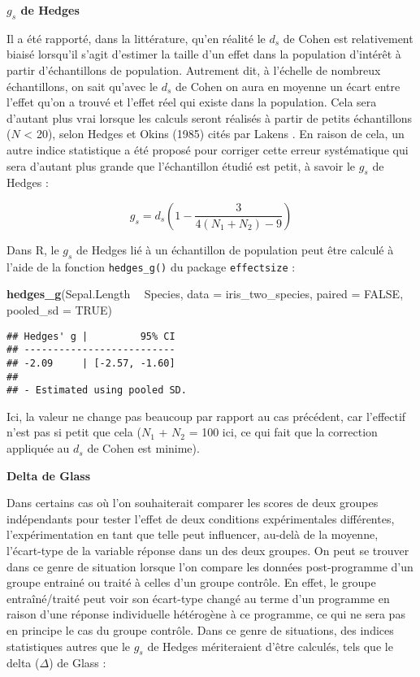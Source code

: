 \documentclass[
  french,
]{book}
\newenvironment{Shaded}{\begin{snugshade}}{\end{snugshade}}
\newcommand{\DataTypeTok}[1]{\textcolor[rgb]{0.13,0.29,0.53}{#1}}
\newcommand{\KeywordTok}[1]{\textcolor[rgb]{0.13,0.29,0.53}{\textbf{#1}}}
\newcommand{\NormalTok}[1]{#1}
\newcommand{\OperatorTok}[1]{\textcolor[rgb]{0.81,0.36,0.00}{\textbf{#1}}}
\newcommand{\OtherTok}[1]{\textcolor[rgb]{0.56,0.35,0.01}{#1}}
\newcommand{\StringTok}[1]{\textcolor[rgb]{0.31,0.60,0.02}{#1}}
\begin{document}
\textbf{\(g_{s}\) de Hedges}

Il a été rapporté, dans la littérature, qu'en réalité le \(d_{s}\) de Cohen est relativement biaisé lorsqu'il s'agit d'estimer la taille d'un effet dans la population d'intérêt à partir d'échantillons de population. Autrement dit, à l'échelle de nombreux échantillons, on sait qu'avec le \(d_{s}\) de Cohen on aura en moyenne un écart entre l'effet qu'on a trouvé et l'effet réel qui existe dans la population. Cela sera d'autant plus vrai lorsque les calculs seront réalisés à partir de petits échantillons (\(N\) \textless{} 20), selon Hedges et Okins (1985) cités par Lakens \autocite*{lakensCalculatingReportingEffect2013}. En raison de cela, un autre indice statistique a été proposé pour corriger cette erreur systématique qui sera d'autant plus grande que l'échantillon étudié est petit, à savoir le \(g_{s}\) de Hedges :

\[g_{s} = d_{s} (1 - \frac{3}{4(N_{1} + N_{2}) - 9})\]

Dans R, le \(g_{s}\) de Hedges lié à un échantillon de population peut être calculé à l'aide de la fonction \texttt{hedges\_g()} du package \texttt{effectsize} :

\begin{Shaded}
\begin{Highlighting}[]
\KeywordTok{hedges_g}\NormalTok{(Sepal.Length }\OperatorTok{~}\StringTok{ }\NormalTok{Species, }
         \DataTypeTok{data =}\NormalTok{ iris_two_species, }
         \DataTypeTok{paired =} \OtherTok{FALSE}\NormalTok{, }
         \DataTypeTok{pooled_sd =} \OtherTok{TRUE}\NormalTok{)}
\end{Highlighting}
\end{Shaded}

\begin{verbatim}
## Hedges' g |         95% CI
## --------------------------
## -2.09     | [-2.57, -1.60]
## 
## - Estimated using pooled SD.
\end{verbatim}

Ici, la valeur ne change pas beaucoup par rapport au cas précédent, car l'effectif n'est pas si petit que cela (\(N_{1}\) + \(N_{2}\) = 100 ici, ce qui fait que la correction appliquée au \(d_{s}\) de Cohen est minime).

\textbf{Delta de Glass}

Dans certains cas où l'on souhaiterait comparer les scores de deux groupes indépendants pour tester l'effet de deux conditions expérimentales différentes, l'expérimentation en tant que telle peut influencer, au-delà de la moyenne, l'écart-type de la variable réponse dans un des deux groupes. On peut se trouver dans ce genre de situation lorsque l'on compare les données post-programme d'un groupe entrainé ou traité à celles d'un groupe contrôle. En effet, le groupe entraîné/traité peut voir son écart-type changé au terme d'un programme en raison d'une réponse individuelle hétérogène à ce programme, ce qui ne sera pas en principe le cas du groupe contrôle. Dans ce genre de situations, des indices statistiques autres que le \(g_{s}\) de Hedges mériteraient d'être calculés, tels que le delta (\(\Delta\)) de Glass \autocite{lakensCalculatingReportingEffect2013} :
\end{document}
